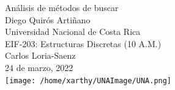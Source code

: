 \documentclass[stu, 12pt, letterpaper, donotrepeattitle, floatsintext, natbib, helv]{apa7}
\begin{document}
\begin{titlepage}
    \centering
    \vfill
    \LARGE Análisis de métodos de buscar\\
    \vskip2cm
    \large Diego Quirós Artiñano \\
    Universidad Nacional de Costa Rica \\
    EIF-203: Estructuras Discretas (10 A.M.) \\ 
    Carlos Loria-Saenz \\
    24 de marzo, 2022 \\
    \vfill
    \texttt{[image: /home/xarthy/UNAImage/UNA.png]} \\
    \vfill
    \vfill
\end{titlepage}

\renewcommand\contentsname{\largeÍndice}
\tableofcontents
\setcounter{tocdepth}{2}
\newpage
\renewcommand{\listfigurename}{\largeÍndice de fíguras}
\listoffigures
\newpage
\renewcommand{\listtablename}{\largeÍndice de tablas}
\listoftables
\newpage


\end{document}
